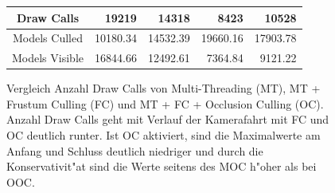 \documentclass[journal]{vgtc}
\begin{document}
\begin{figure}
\begin{minipage}{\textwidth}
{\begin{tabular}{| c | r | r | r | r |}
				Draw Calls           & 19219     & 14318     & 8423     & 10528 		\\ \hline
				Models Culled        & 10180.34  & 14532.39  & 19660.16 & 17903.78 	\\ \hline
				Models Visible       & 16844.66  & 12492.61  & 7364.84  & 9121.22 	\\ \hline
			\end{tabular}}
	\end{minipage}
	\caption{Vergleich Anzahl Draw Calls von Multi-Threading (MT), MT + Frustum Culling (FC) und MT + FC + Occlusion Culling (OC). Anzahl Draw Calls geht mit Verlauf der Kamerafahrt mit FC und OC deutlich runter. Ist OC aktiviert, sind die Maximalwerte am Anfang und Schluss deutlich niedriger und durch die Konservativit"at sind die Werte seitens des MOC h"oher als bei OOC.}
	\label{fig:OGL_MOC_frustum_culling}
\end{figure}

\end{document}
